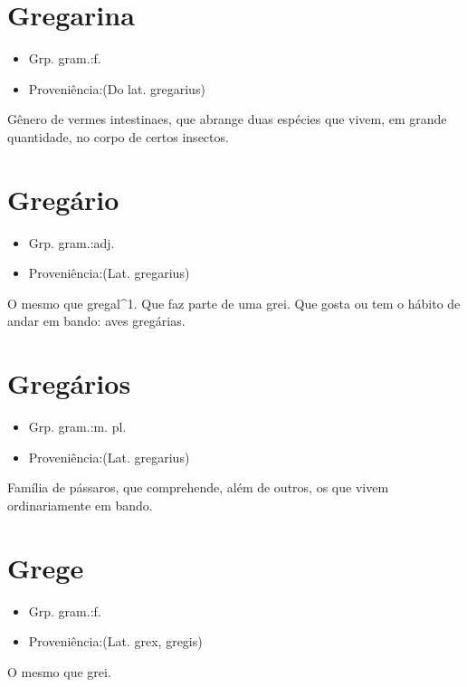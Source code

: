 \section{Gregarina}
\begin{itemize}
\item {Grp. gram.:f.}
\end{itemize}
\begin{itemize}
\item {Proveniência:(Do lat. \textunderscore gregarius\textunderscore )}
\end{itemize}
Gênero de vermes intestinaes, que abrange duas espécies que vivem, em grande quantidade, no corpo de certos insectos.
\section{Gregário}
\begin{itemize}
\item {Grp. gram.:adj.}
\end{itemize}
\begin{itemize}
\item {Proveniência:(Lat. \textunderscore gregarius\textunderscore )}
\end{itemize}
O mesmo que \textunderscore gregal\textunderscore ^1.
Que faz parte de uma grei.
Que gosta ou tem o hábito de andar em bando: \textunderscore aves gregárias\textunderscore .
\section{Gregários}
\begin{itemize}
\item {Grp. gram.:m. pl.}
\end{itemize}
\begin{itemize}
\item {Proveniência:(Lat. \textunderscore gregarius\textunderscore )}
\end{itemize}
Família de pássaros, que comprehende, além de outros, os que vivem ordinariamente em bando.
\section{Grege}
\begin{itemize}
\item {Grp. gram.:f.}
\end{itemize}
\begin{itemize}
\item {Proveniência:(Lat. \textunderscore grex\textunderscore , \textunderscore gregis\textunderscore )}
\end{itemize}
O mesmo que \textunderscore grei\textunderscore .
